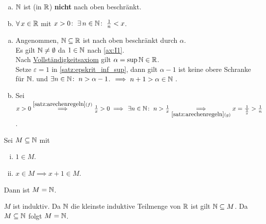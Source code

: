 \documentclass[../ana1.tex]{subfiles}
\begin{document}
\begin{satz}\label{satz:arch_prinz}\leavevmode
	\begin{enumerate}[(a)]
		\item \(\mathbb{N} \) ist (in \(\mathbb{R} \)) \textbf{nicht} nach oben beschränkt.
		\item \(\forall \, x \in \mathbb{R} \) mit \(x > 0 \colon \; \exists \, n \in \mathbb{N} \colon \; \frac{1}{n} < x \).
	\end{enumerate}
\end{satz}
\begin{bew}\leavevmode
	\begin{enumerate}[(a)]
		\item Angenommen, \(\mathbb{N} \subseteq \mathbb{R} \) ist nach oben beschränkt durch \(\alpha \). \\
		      Es gilt \(\mathbb{N} \neq \emptyset \) da \(1 \in \mathbb{N} \) nach \autoref{ax:I1}. \\
		      Nach \hyperref[ax:V]{Vollständigkeitsaxiom} gilt \(\alpha = \sup \mathbb{N} \in \mathbb{R} \). \\
		      Setze \(\varepsilon = 1 \) in \autoref{satz:epskrit_inf_sup}, dann gilt \(\alpha - 1 \) ist keine obere Schranke für \(\mathbb{N} \).
		      und \(\exists n \in \mathbb{N} \colon \; n > \alpha - 1 \).
			  \(\implies n+1 > \alpha \in \mathbb{N} \) \Lightning.
		\item Sei \(x > 0 \overset{\autoref{satz:arechenregeln}{(f)}}{\implies} \frac{1}{x} > 0 \implies \, \exists n \in \N \colon \; n > \frac{1}{x} \\
		      \underset{\autoref{satz:arechenregeln}{(g)}}{\implies} x = \frac{1}{\frac{1}{x}} > \frac{1}{n} \).\qedhere
	\end{enumerate}
\end{bew}

\begin{satz}[Induktionsprinzip]\label{satz:ind_prinz}
	Sei \(M \subseteq \mathbb{N} \) mit
	\begin{enumerate}[(i)]
		\item \(1\in M \).
		\item \(x \in M \implies x + 1 \in M \).
	\end{enumerate}
	Dann ist \(M = \mathbb{N} \).
\end{satz}
\begin{bew}
	\(M \) ist induktiv. Da \(\mathbb{N} \) die kleinste induktive Teilmenge von \(\mathbb{R} \) ist gilt \(\mathbb{N} \subseteq M \).
	Da \(M \subseteq \mathbb{N} \) folgt \(M = \mathbb{N} \).
\end{bew}
\end{document}
